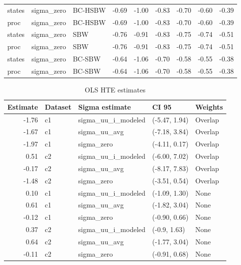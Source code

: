 \begin{table}[ht]
\begin{tabular}{lllrrrrrr}
  states & sigma\_zero & BC-HSBW & -0.69 & -1.00 & -0.83 & -0.70 & -0.60 & -0.39 \\ 
  proc & sigma\_zero & BC-HSBW & -0.69 & -1.00 & -0.83 & -0.70 & -0.60 & -0.39 \\ 
  states & sigma\_zero & SBW & -0.76 & -0.91 & -0.83 & -0.75 & -0.74 & -0.51 \\ 
  proc & sigma\_zero & SBW & -0.76 & -0.91 & -0.83 & -0.75 & -0.74 & -0.51 \\ 
  states & sigma\_zero & BC-SBW & -0.64 & -1.06 & -0.70 & -0.58 & -0.55 & -0.38 \\ 
  proc & sigma\_zero & BC-SBW & -0.64 & -1.06 & -0.70 & -0.58 & -0.55 & -0.38 \\ 
   \hline
\end{tabular}
\end{table}

\begin{table}[ht]
\caption{OLS HTE estimates}
\label{tab:hte}
\centering
\begin{tabular}{rllll}
  \hline
Estimate & Dataset & Sigma estimate & CI 95 & Weights \\ 
  \hline
  -1.76 & c1 & sigma\_uu\_i\_modeled & (-5.47, 1.94) & Overlap \\ 
  -1.67 & c1 & sigma\_uu\_avg & (-7.18, 3.84) & Overlap \\ 
  -1.97 & c1 & sigma\_zero & (-4.11, 0.17) & Overlap \\ 
  0.51 & c2 & sigma\_uu\_i\_modeled & (-6.00, 7.02) & Overlap \\ 
  -0.17 & c2 & sigma\_uu\_avg & (-8.17, 7.83) & Overlap \\ 
  -1.48 & c2 & sigma\_zero & (-3.51, 0.54) & Overlap \\ 
  0.10 & c1 & sigma\_uu\_i\_modeled & (-1.09, 1.30) & None \\ 
  0.61 & c1 & sigma\_uu\_avg & (-1.82, 3.04) & None \\ 
  -0.12 & c1 & sigma\_zero & (-0.90, 0.66) & None \\ 
  0.37 & c2 & sigma\_uu\_i\_modeled & (-0.9, 1.63) & None \\ 
  0.64 & c2 & sigma\_uu\_avg & (-1.77, 3.04) & None \\ 
  -0.11 & c2 & sigma\_zero & (-0.91, 0.68) & None \\ 
   \hline
\end{tabular}
\end{table}
